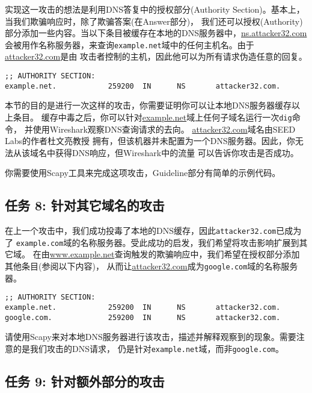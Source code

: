 实现这一攻击的想法是利用DNS答复中的授权部分(Authority Section)。基本上，当我们欺骗响应时，除了欺骗答案(在Answer部分)，
我们还可以授权(Authority)部分添加一些内容。当以下条目被缓存在本地的DNS服务器中，\url{ns.attacker32.com}
会被用作名称服务器，来查询\texttt{example.net}域中的任何主机名。由于\url{attacker32.com}是由
攻击者控制的主机，因此他可以为所有请求伪造任意的回复。

\begin{lstlisting}
;; AUTHORITY SECTION:
example.net.            259200  IN      NS       attacker32.com.
\end{lstlisting}
 
 
本节的目的是进行一次这样的攻击，你需要证明你可以让本地DNS服务器缓存以上条目。
缓存中毒之后，你可以针对\url{example.net}域上任何子域名运行一次\texttt{dig}命令，
并使用Wireshark观察DNS查询请求的去向。 \url{attacker32.com}域名由SEED Labs的作者杜文亮教授
拥有，但该机器并未配置为一个DNS服务器。因此，你无法从该域名中获得DNS响应，但Wireshark中的流量
可以告诉你攻击是否成功。

你需要使用Scapy工具来完成这项攻击，Guideline部分有简单的示例代码。



\subsection{任务 8: 针对其它域名的攻击} 

在上一个攻击中，我们成功投毒了本地的DNS缓存，因此\texttt{attacker32.com}已成为了
\texttt{example.com}域的名称服务器。受此成功的启发，我们希望将攻击影响扩展到其它域。
在由\url{www.example.net}查询触发的欺骗响应中，我们希望在授权部分添加其他条目(参阅以下内容)，
从而让\url{attacker32.com}成为\texttt{google.com}域的名称服务器。


\begin{lstlisting}
;; AUTHORITY SECTION:
example.net.            259200  IN      NS       attacker32.com.
google.com.             259200  IN      NS       attacker32.com.
\end{lstlisting}

请使用Scapy来对本地DNS服务器进行该攻击，描述并解释观察到的现象。需要注意的是我们攻击的DNS请求，
仍是针对\texttt{example.net}域，而非\texttt{google.com}。


\subsection{任务 9: 针对额外部分的攻击}

